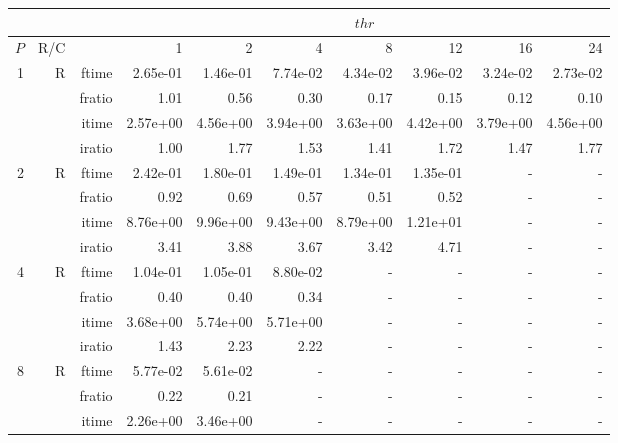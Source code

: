 \documentclass[a4paper]{article}
\begin{document}
\begin{table}[htbp]
\begin{center}
\begin{small}
\begin{tabular}{|r|r|r|r|r|r|r|r|r|r|}
\hline 
     & & & \multicolumn{7}{c|}{$thr$} \\ \hline
    $P$ & R/C &  & 1           & 2    & 4    & 8    & 12   & 16    & 24  \\ \hline\hline
     1 & R & ftime & 2.65e-01 & 1.46e-01 & 7.74e-02 & 4.34e-02 & 3.96e-02 & 3.24e-02 & 2.73e-02 \\   
          &      & fratio & 1.01 & 0.56 & 0.30 & 0.17 & 0.15 & 0.12 & 0.10 \\   
          &      & itime & 2.57e+00 & 4.56e+00 & 3.94e+00 & 3.63e+00 & 4.42e+00 & 3.79e+00 & 4.56e+00 \\   
          &      & iratio & 1.00 & 1.77 & 1.53 & 1.41 & 1.72 & 1.47 & 1.77 \\ \hline 
     2 & R & ftime & 2.42e-01 & 1.80e-01 & 1.49e-01 & 1.34e-01 & 1.35e-01 &     -     &     -     \\   
          &      & fratio & 0.92 & 0.69 & 0.57 & 0.51 & 0.52 &     -     &     -     \\   
          &      & itime & 8.76e+00 & 9.96e+00 & 9.43e+00 & 8.79e+00 & 1.21e+01 &     -     &     -     \\   
          &      & iratio & 3.41 & 3.88 & 3.67 & 3.42 & 4.71 &     -     &     -     \\ \hline 
     4 & R & ftime & 1.04e-01 & 1.05e-01 & 8.80e-02 &     -     &     -     &     -     &     -     \\   
          &      & fratio & 0.40 & 0.40 & 0.34 &     -     &     -     &     -     &     -     \\   
          &      & itime & 3.68e+00 & 5.74e+00 & 5.71e+00 &     -     &     -     &     -     &     -     \\   
          &      & iratio & 1.43 & 2.23 & 2.22 &     -     &     -     &     -     &     -     \\ \hline 
     8 & R & ftime & 5.77e-02 & 5.61e-02 &     -     &     -     &     -     &     -     &     -     \\   
          &      & fratio & 0.22 & 0.21 &     -     &     -     &     -     &     -     &     -     \\   
          &      & itime & 2.26e+00 & 3.46e+00 &     -     &     -     &     -     &     -     &     -     \\   

\end{tabular}
\end{small}
\end{center}
\end{table}
\end{document}
